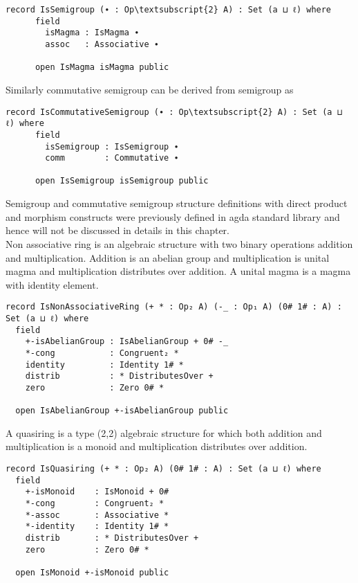 \begin{Verbatim}[commandchars=\\\{\},samepage=true]
	record IsSemigroup (∙ : Op\textsubscript{2} A) : Set (a ⊔ ℓ) where
	  field
	    isMagma : IsMagma ∙
	    assoc   : Associative ∙
	
	  open IsMagma isMagma public
\end{Verbatim}
Similarly commutative semigroup can be derived from semigroup as
\begin{Verbatim}[commandchars=\\\{\},samepage=true]
	record IsCommutativeSemigroup (∙ : Op\textsubscript{2} A) : Set (a ⊔ ℓ) where
	  field
	    isSemigroup : IsSemigroup ∙
	    comm        : Commutative ∙
	
	  open IsSemigroup isSemigroup public
\end{Verbatim}
Semigroup and commutative semigroup structure definitions with direct product and morphism constructs were previously defined in agda standard library and hence will not be discussed in details in this chapter.\\
Non associative ring is an algebraic structure with two binary operations addition and multiplication. Addition is an abelian group and multiplication is unital magma and multiplication distributes over addition. A unital magma is a magma with identity element. 
\begin{Verbatim}
record IsNonAssociativeRing (+ * : Op₂ A) (-_ : Op₁ A) (0# 1# : A) : Set (a ⊔ ℓ) where
  field
    +-isAbelianGroup : IsAbelianGroup + 0# -_
    *-cong           : Congruent₂ *
    identity         : Identity 1# *
    distrib          : * DistributesOver +
    zero             : Zero 0# *

  open IsAbelianGroup +-isAbelianGroup public
\end{Verbatim}

A quasiring is a type (2,2) algebraic structure for which both addition and multiplication is a monoid and multiplication distributes over addition.

\begin{Verbatim}
record IsQuasiring (+ * : Op₂ A) (0# 1# : A) : Set (a ⊔ ℓ) where
  field
    +-isMonoid    : IsMonoid + 0#
    *-cong        : Congruent₂ *
    *-assoc       : Associative *
    *-identity    : Identity 1# *
    distrib       : * DistributesOver +
    zero          : Zero 0# *

  open IsMonoid +-isMonoid public
\end{Verbatim}

